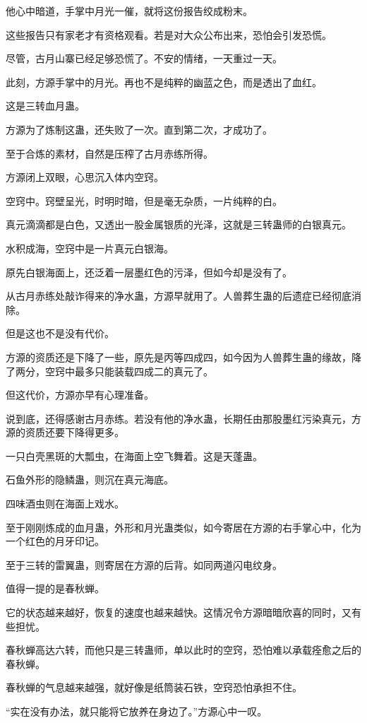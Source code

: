 \begin{this_body}
他心中暗道，手掌中月光一催，就将这份报告绞成粉末。

这些报告只有家老才有资格观看。若是对大众公布出来，恐怕会引发恐慌。

尽管，古月山寨已经足够恐慌了。不安的情绪，一天重过一天。

此刻，方源手掌中的月光。再也不是纯粹的幽蓝之色，而是透出了血红。

这是三转血月蛊。

方源为了炼制这蛊，还失败了一次。直到第二次，才成功了。

至于合炼的素材，自然是压榨了古月赤练所得。

方源闭上双眼，心思沉入体内空窍。

空窍中。窍壁呈光，时明时暗，但是毫无杂质，一片纯粹的白。

真元滴滴都是白色，又透出一股金属银质的光泽，这就是三转蛊师的白银真元。

水积成海，空窍中是一片真元白银海。

原先白银海面上，还泛着一层墨红色的污泽，但如今却是没有了。

从古月赤练处敲诈得来的净水蛊，方源早就用了。人兽葬生蛊的后遗症已经彻底消除。

但是这也不是没有代价。

方源的资质还是下降了一些，原先是丙等四成四，如今因为人兽葬生蛊的缘故，降了两分，空窍中最多只能装载四成二的真元了。

但这代价，方源亦早有心理准备。

说到底，还得感谢古月赤练。若没有他的净水蛊，长期任由那股墨红污染真元，方源的资质还要下降得更多。

一只白壳黑斑的大瓢虫，在海面上空飞舞着。这是天蓬蛊。

石鱼外形的隐鳞蛊，则沉在真元海底。

四味酒虫则在海面上戏水。

至于刚刚炼成的血月蛊，外形和月光蛊类似，如今寄居在方源的右手掌心中，化为一个红色的月牙印记。

至于三转的雷翼蛊，则寄居在方源的后背。如同两道闪电纹身。

值得一提的是春秋蝉。

它的状态越来越好，恢复的速度也越来越快。这情况令方源暗暗欣喜的同时，又有些担忧。

春秋蝉高达六转，而他只是三转蛊师，单以此时的空窍，恐怕难以承载痊愈之后的春秋蝉。

春秋蝉的气息越来越强，就好像是纸筒装石铁，空窍恐怕承担不住。

“实在没有办法，就只能将它放养在身边了。”方源心中一叹。


\end{this_body}
